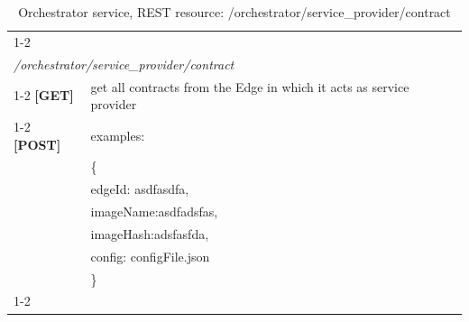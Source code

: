 \begin{table}[H] %
\begin{tabular}{|l|l|lll}
\cline{1-2}
\multicolumn{2}{|l|}{{\ul }}                                                               &  &  &  \\
\multicolumn{2}{|l|}{\textit{/orchestrator/service\_provider/contract}}                    &  &  &  \\ \cline{1-2}
\textbf{{[}GET{]}}  & get all contracts from the Edge in which it acts as service provider &  &  &  \\ \cline{1-2}
\textbf{{[}POST{]}} & examples:                                                            &  &  &  \\
                    & \{                                                                   &  &  &  \\
                    & edgeId: asdfasdfa,                                                   &  &  &  \\
                    & imageName:asdfadsfas,                                                &  &  &  \\
                    & imageHash:adsfasfda,                                                 &  &  &  \\
                    & config: configFile.json                                               &  &  &  \\
                    & \}                                                                   &  &  &  \\ \cline{1-2}
\end{tabular}
\caption{Orchestrator service, REST resource:  /orchestrator/service\_provider/contract}
\end{table}
